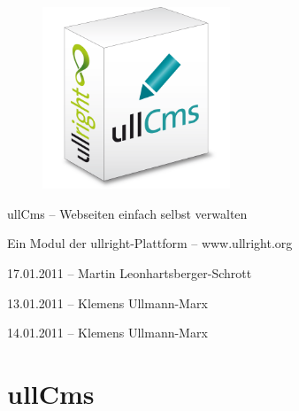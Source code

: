 \documentclass[article, a4paper, oneside, 11pt]{memoir}
\begin{document}
\vspace*{3cm}
\begin{figure}[htp]
\centering
\includegraphics[width=0.5\textwidth]{softwarebox}
\end{figure}

\vspace{3cm}

{%
\huge
\color{ullblue}
ullCms -- Webseiten einfach selbst verwalten
}

\vspace{0.2cm}

{%
\large
Ein Modul der ullright-Plattform -- www.ullright.org
}

\vspace{1cm}

{%
\footnotesize
17.01.2011 -- Martin Leonhartsberger-Schrott

13.01.2011 -- Klemens Ullmann-Marx

14.01.2011 -- Klemens Ullmann-Marx
}

\clearpage

\pagestyle{plain}


\setcounter{secnumdepth}{2}
\setcounter{tocdepth}{2}
\tableofcontents*

\clearpage

\addtocounter{chapter}{1}

\chapter*{ullCms}
\end{document}
